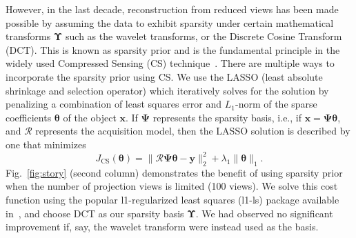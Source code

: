 \documentclass[journal]{IEEEtran}
\begin{document}
However, in the last decade, reconstruction from reduced views has
been made possible by assuming the data to exhibit sparsity under
certain mathematical transforms $\boldsymbol{\Upsilon}$ such as the
wavelet transforms, or the Discrete Cosine Transform (DCT). This is
known as sparsity prior and is the fundamental principle in the widely
used Compressed Sensing (CS) technique~\cite{Donoho,introCS}.  There
are multiple ways to incorporate the sparsity prior using CS. We use
the LASSO (least absolute shrinkage and selection operator) which
iteratively solves for the solution by penalizing a combination of
least squares error and $L_1$-norm of the sparse coefficients
$\boldsymbol{\theta}$ of the object $\boldsymbol{x}$. If $\boldsymbol{\Psi}$
represents the sparsity basis, i.e., if $\boldsymbol{x} = \boldsymbol{\Psi\theta}$, and 
$\boldsymbol{\mathcal{R}}$ represents the acquisition model, then the
LASSO solution is described by one that minimizes
 \begin{equation}
J_{\text{CS}}(\boldsymbol{\theta}) = \lVert\boldsymbol{\mathcal{R} \Psi\theta}- \boldsymbol{y}\rVert_2^2  + \lambda_1\lVert\boldsymbol{\theta}\rVert_1.
\label{Eq:simple_cs}
 \end{equation}
 Fig.~\ref{fig:story}
 (second column) demonstrates the benefit of using sparsity prior when
 the number of projection views is limited (100 views).
 We solve this cost function using the popular l1-regularized least
 squares (l1-ls) package available in~\cite{l1ls}, and choose DCT as
 our sparsity basis $\boldsymbol{\Upsilon}$. We had observed no significant improvement if, say, the wavelet transform were instead used as the basis.  

\end{document}
